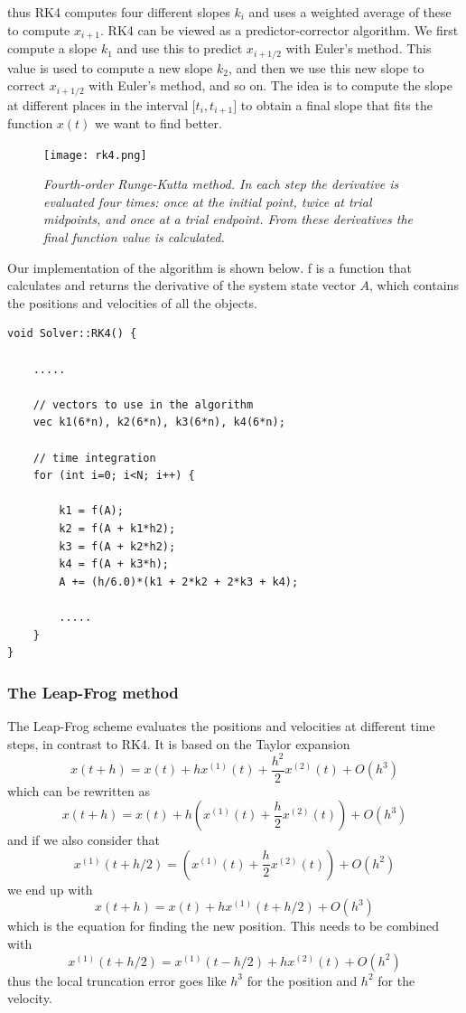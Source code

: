 \documentclass[a4paper,12pt, english]{article}
\begin{document}
thus RK4 computes four different slopes $k_i$ and uses a weighted average of these to compute $x_{i+1}$. RK4 can be viewed as a predictor-corrector algorithm. We first compute a slope $k_1$ and use this to predict $x_{i+1/2}$ with Euler's method. This value is used to compute a new slope $k_2$, and then we use this new slope to correct $x_{i+1/2}$ with Euler's method, and so on. The idea is to compute the slope at different places in the interval $\lbrack t_i,t_{i+1} \rbrack$ to obtain a final slope that fits the function $x(t)$ we want to find better.

\begin{figure}[H]
  \centering \texttt{[image: rk4.png]}
  \caption{\textit{Fourth-order Runge-Kutta method. In each step the derivative is evaluated four times:
once at the initial point, twice at trial midpoints, and once at a trial endpoint. From these derivatives the
final function value is calculated. }}
\end{figure}

\lstset{
  basicstyle=\small\ttfamily,
  frame=lrtb,
  numbers=left
}

Our implementation of the algorithm is shown below. f is a function that calculates and returns the derivative of the system state vector $A$, which contains the positions and velocities of all the objects.

\begin{lstlisting}[title={Function RK4}]
void Solver::RK4() {

    .....

    // vectors to use in the algorithm
    vec k1(6*n), k2(6*n), k3(6*n), k4(6*n);
 
    // time integration
    for (int i=0; i<N; i++) {

        k1 = f(A);
        k2 = f(A + k1*h2);
        k3 = f(A + k2*h2);
        k4 = f(A + k3*h);
        A += (h/6.0)*(k1 + 2*k2 + 2*k3 + k4);
        
        .....
    }
}
\end{lstlisting}



\subsubsection*{The Leap-Frog method}

The Leap-Frog scheme evaluates the positions and velocities at different time steps, in contrast to RK4. It is based on the Taylor expansion
\[
x(t+h) = x(t) + hx^{(1)}(t) + \frac{h^2}{2}x^{(2)}(t) + O(h^3)
\]
which can be rewritten as
\[
x(t+h) = x(t) + h \left( x^{(1)}(t) + \frac{h}{2}x^{(2)}(t) \right) + O(h^3)
\]
and if we also consider that
\[
x^{(1)}(t+h/2) = \left( x^{(1)}(t) + \frac{h}{2}x^{(2)}(t) \right) + O(h^2)
\]
we end up with
\[
x(t+h) = x(t) + hx^{(1)}(t+h/2) + O(h^3) \tag{1}
\]
which is the equation for finding the new position. This needs to be combined with
\[
x^{(1)}(t+h/2) = x^{(1)}(t-h/2) + hx^{(2)}(t) + O(h^2) \tag{2}
\]
thus the local truncation error goes like $h^3$ for the position and $h^2$ for the velocity.
\end{document}
